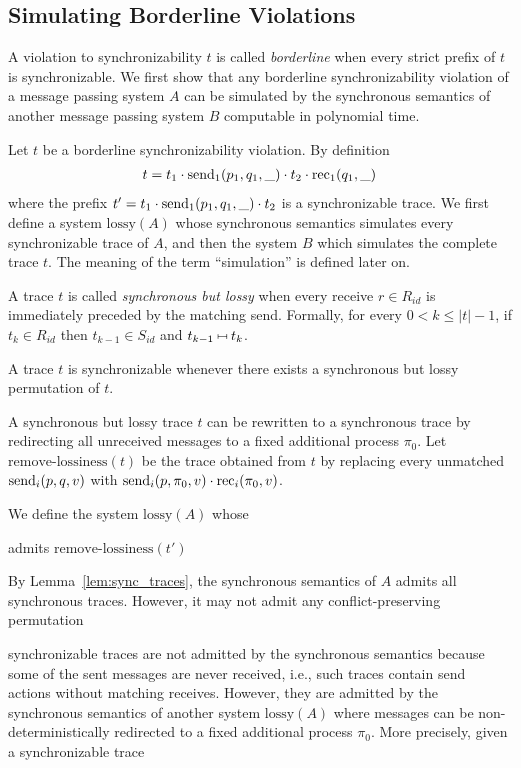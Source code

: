 \subsection{Simulating Borderline Violations}

A violation to synchronizability $t$ is called \emph{borderline} when every strict prefix of $t$ is synchronizable.
We first show that any borderline synchronizability violation of a message passing system $A$ can be simulated by 
the synchronous semantics of another message passing system $B$ computable in polynomial time.

Let $t$ be a borderline synchronizability violation. By definition 
\begin{align*}
t=t_1\cdot \mathrm{send}_{1}({p_1,q_1,\_}) \cdot t_2\cdot \mathrm{rec}_{1}({q_1,\_})
\end{align*} 
where the prefix $t' = t_1\cdot \mathrm{send}_{1}({p_1,q_1,\_}) \cdot t_2$ is a synchronizable trace.
We first define a system $\mathrm{lossy}(A)$ whose synchronous semantics simulates every synchronizable 
trace of $A$, and then the system $B$ which simulates the complete trace $t$. The meaning of 
the term ``simulation'' is defined later on.

A trace $t$ is called \emph{synchronous but lossy} when every receive $r\in R_{id}$ is immediately 
preceded by the matching send. Formally, for every $0 < k\leq |t| -1$, if $t_k\in R_{id}$ then 
$t_{k-1}\in S_{id}$ and $t_{k-1}\match t_{k}$.

\begin{lemma}
A trace $t$ is synchronizable whenever there exists a synchronous but lossy permutation of $t$.
\end{lemma}

A synchronous but lossy trace $t$ can be rewritten to a synchronous trace by redirecting all unreceived messages 
to a fixed additional process $\pi_0$. Let $\mathrm{remove\text{-}lossiness}(t)$ be the trace obtained from $t$
by replacing every unmatched $\mathrm{send}_{i}({p,q,v})$ with $\mathrm{send}_{i}({p,\pi_0,v})\cdot \mathrm{rec}_{i}({\pi_0,v})$.

We define the system $\mathrm{lossy}(A)$ whose 

 admits $\mathrm{remove\text{-}lossiness}(t')$ 


By Lemma~\ref{lem:sync_traces}, the synchronous semantics of $A$ admits all synchronous traces. 
However, it may not admit any conflict-preserving permutation 


synchronizable traces are not admitted by the synchronous semantics because some of the sent messages
are never received, i.e., such traces contain send actions without matching receives. 
However, they are admitted by the synchronous semantics of another system $\mathrm{lossy}(A)$ where
messages can be non-deterministically redirected to a fixed additional process $\pi_0$.
More precisely, given a synchronizable trace

